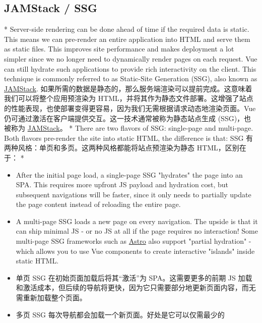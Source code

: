 \begin{paracol}{2}
\subsection{JAMStack / SSG}
\switchcolumn[0]*%
Server-side rendering can be done ahead of time if the required data is
static. This means we can pre-render an entire application into HTML and
serve them as static files. This improves site performance and makes
deployment a lot simpler since we no longer need to dynamically render
pages on each request. Vue can still hydrate such applications to
provide rich interactivity on the client. This technique is commonly
referred to as Static-Site Generation (SSG), also known as
\href{https://jamstack.org/what-is-jamstack/}{JAMStack}.
\switchcolumn
如果所需的数据是静态的，那么服务端渲染可以提前完成。这意味着我们可以将整个应用预渲染为
HTML，并将其作为静态文件部署。这增强了站点的性能表现，也使部署变得更容易，因为我们无需根据请求动态地渲染页面。Vue
仍可通过激活在客户端提供交互。这一技术通常被称为静态站点生成
(SSG)，也被称为
\href{https://jamstack.org/what-is-jamstack/}{JAMStack}。
\switchcolumn[0]*%
There are two flavors of SSG: single-page and multi-page. Both flavors
pre-render the site into static HTML, the difference is that:
\switchcolumn
SSG 有两种风格：单页和多页。这两种风格都能将站点预渲染为静态
HTML，区别在于：
\switchcolumn[0]*%
\begin{itemize}
\item
  After the initial page load, a single-page SSG "hydrates" the page
  into an SPA. This requires more upfront JS payload and hydration cost,
  but subsequent navigations will be faster, since it only needs to
  partially update the page content instead of reloading the entire
  page.
\item
  A multi-page SSG loads a new page on every navigation. The upside is
  that it can ship minimal JS - or no JS at all if the page requires no
  interaction! Some multi-page SSG frameworks such as
  \href{https://astro.build/}{Astro} also support "partial hydration" -
  which allows you to use Vue components to create interactive "islands"
  inside static HTML.
\end{itemize}
\switchcolumn
\begin{itemize}
\item
  单页 SSG 在初始页面加载后将其``激活''为 SPA。这需要更多的前期 JS
  加载和激活成本，但后续的导航将更快，因为它只需要部分地更新页面内容，而无需重新加载整个页面。
\item
  多页 SSG 每次导航都会加载一个新页面。好处是它可以仅需最少的

\end{itemize}
\end{paracol}
